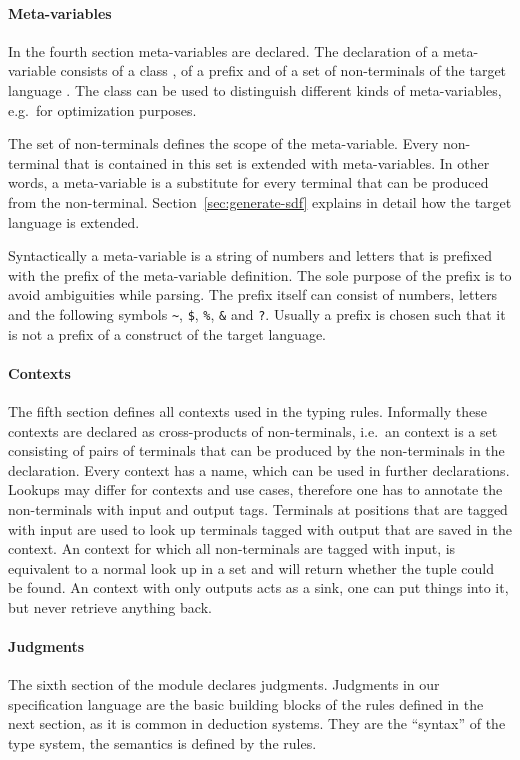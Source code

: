 \paragraph{Meta-variables} In the fourth section meta-variables are
declared. The declaration of a meta-variable consists of a class
, of a prefix 
and of a set of non-terminals of the target language
. The class can be used to distinguish
different kinds of meta-variables, e.g.\ for optimization
purposes. 

The set of non-terminals defines the scope of the meta-variable. Every
non-terminal that is contained in this set is extended with
meta-variables. In other words, a meta-variable is a substitute for
every terminal that can be produced from the
non-terminal. Section~\ref{sec:generate-sdf} explains in detail how
the target language is extended.

Syntactically a meta-variable is a string of numbers and letters that
is prefixed with the prefix of the meta-variable definition. The sole
purpose of the prefix is to avoid ambiguities while parsing. The
prefix itself can consist of numbers, letters and the following
symbols \verb|~|, \verb|$|, \verb|%|, \verb|&| and \verb|?|.
 Usually a prefix is chosen such that it
is not a prefix of a construct of the target language.

\paragraph{Contexts} The fifth section defines all contexts used in
the typing rules. Informally these contexts are declared as
cross-products of non-terminals, i.e.\ an context is a set consisting
of pairs of terminals that can be produced by the non-terminals in the
declaration. Every context has a name, which can be used in further
declarations. Lookups may differ for contexts and use cases, therefore
one has to annotate the non-terminals with input and output
tags. Terminals at positions that are tagged with input are used to
look up terminals tagged with output that are saved in the context. An
context for which all non-terminals are tagged with input, is
equivalent to a normal look up in a set and will return whether the
tuple could be found. An context with only outputs acts as a sink, one
can put things into it, but never retrieve anything back.

\paragraph{Judgments} The sixth section of the module declares
judgments. Judgments in our specification language are the basic
building blocks of the rules defined in the next section, as it is
common in deduction systems. They are the ``syntax'' of the type
system, the semantics is defined by the rules.

